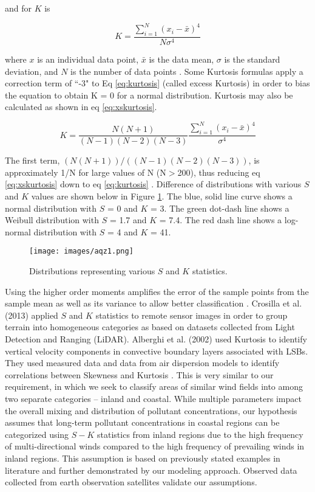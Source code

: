 \noindent
and for $K$ is 

\begin{equation}
\label{eq:kurtosis}
K = \frac{\sum_{i=1}^{N}\left (x_{i}-\bar{x} \right )^{4}}{N\sigma^{4}}
\end{equation}

\noindent
where $x$ is an individual data point, $\bar{x}$ is the data mean, $\sigma$ is the standard deviation, and $N$ is the number of data points \citep{Cristelli2012}.    Some Kurtosis formulas apply a correction term of ``-3" to Eq \ref{eq:kurtosis} (called excess Kurtosis) in order to bias the equation to obtain K = 0 for a normal distribution.  Kurtosis may also be calculated as shown in eq \ref{eq:xskurtosis}.

\begin{equation}
\label{eq:xskurtosis}
K = \frac{N(N+1)}{(N-1)(N-2)(N-3)} \frac{\sum_{i=1}^{N}\left (x_{i}-\bar{x} \right )^{4}}{\sigma^{4}}
\end{equation}

The first term, $(N(N+1))/((N-1)(N-2)(N-3))$, is approximately 1/N for large values of N (N$>$200), thus reducing eq \ref{eq:xskurtosis} down to eq \ref{eq:kurtosis} \citep{Cox2010}.  Difference of distributions with various $S$ and $K$ values are shown below in Figure \ref{fig:SKcurves}.  The blue, solid line curve shows a normal distribution with $S$ = 0 and $K$ = 3. The green dot-dash line shows a Weibull distribution with $S$ = 1.7 and $K$ = 7.4.  The red dash line shows a log-normal distribution with $S$ = 4 and $K$ = 41. 
%
\begin{figure}
\texttt{[image: images/aqz1.png]} 
\caption{Distributions representing various $S$ and $K$ statistics.}
\label{fig:SKcurves}
\end{figure}
%
Using the higher order moments amplifies the error of the sample points from the sample mean as well as its variance to allow better classification \citep{Seo2011}.  Crosilla et al. (2013) applied $S$ and $K$ statistics to remote sensor images in order to group terrain into homogeneous categories as based on datasets collected from Light Detection and Ranging (LiDAR).  Alberghi et al. (2002) used Kurtosis to identify vertical velocity components in convective boundary layers associated with LSBs.  They used measured data and data from air dispersion models to identify correlations between Skewness and Kurtosis \citep{Alberghi2002}.  This is very similar to our requirement, in which we seek to classify areas of similar wind fields into among two separate categories – inland and coastal.  While multiple parameters impact the overall mixing and distribution of pollutant concentrations, our hypothesis assumes that long-term pollutant concentrations in coastal regions can be categorized using $S-K$ statistics from inland regions due to the high frequency of multi-directional winds compared to the high frequency of prevailing winds in inland regions.  This assumption is based on previously stated examples in literature and further demonstrated by our modeling approach.  Observed data collected from earth observation satellites validate our assumptions.


